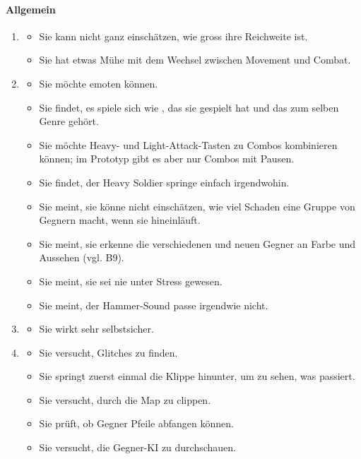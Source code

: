 \documentclass[../Main.tex]{subfiles}
\begin{document}
\paragraph{Allgemein}
\begin{enumerate}[label=\textbf{B\arabic*}, leftmargin=1.5cm, itemsep=0.8em, resume]
\item
\begin{itemize}[nosep]
\item Sie kann nicht ganz einschätzen, wie gross ihre Reichweite ist.
\item Sie hat etwas Mühe mit dem Wechsel zwischen Movement und Combat.
\end{itemize}
\item
\begin{itemize}[nosep]
\item Sie möchte emoten können.
\item Sie findet, es spiele sich wie , das sie gespielt hat und das zum selben Genre gehört.
\item Sie möchte Heavy- und Light-Attack-Tasten zu Combos kombinieren können; im Prototyp gibt es aber nur Combos mit Pausen.
\item Sie findet, der Heavy Soldier springe einfach irgendwohin.
\item Sie meint, sie könne nicht einschätzen, wie viel Schaden eine Gruppe von Gegnern macht, wenn sie hineinläuft.
\item Sie meint, sie erkenne die verschiedenen und neuen Gegner an Farbe und Aussehen (vgl. B9).
\item Sie meint, sie sei nie unter Stress gewesen.
\item Sie meint, der Hammer-Sound passe irgendwie nicht.
\end{itemize}
\item
\begin{itemize}[nosep]
\item Sie wirkt sehr selbstsicher.
\end{itemize}
\item
\begin{itemize}[nosep]
\item Sie versucht, Glitches zu finden.
\item Sie springt zuerst einmal die Klippe hinunter, um zu sehen, was passiert.
\item Sie versucht, durch die Map zu clippen.
\item Sie prüft, ob Gegner Pfeile abfangen können.
\item Sie versucht, die Gegner-KI zu durchschauen.

\end{itemize}
\end{enumerate}
\end{document}
